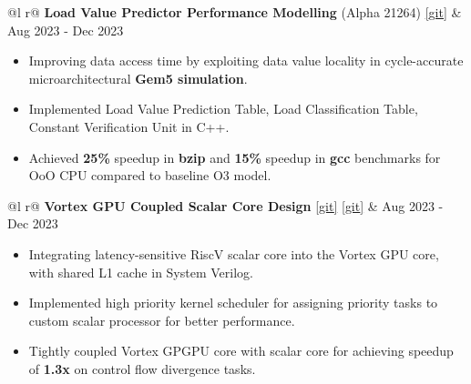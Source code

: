 \documentclass[a4paper,10pt]{article}
\begin{document}
\begin{tabularx}{\linewidth}{ @{}l r@{} }
    \textbf{Load Value Predictor Performance Modelling} (Alpha 21264) \href{https://github.com/sharathat45/load_value_predictor/tree/lvp_v1}{[\underline{git}]} 
    & \hfill {\small Aug 2023 - Dec 2023} \\[2.75pt]
    {
        \begin{minipage}[t]{\linewidth}
            \begin{itemize}[nosep, after=\strut, leftmargin=2em, itemsep=3pt]
                \item Improving data access time by exploiting data value locality in cycle-accurate microarchitectural \textbf{Gem5 simulation}. 
                \item Implemented Load Value Prediction Table, Load Classification Table, Constant Verification Unit in C++. 
                \item Achieved \textbf{25\%} speedup in \textbf{bzip} and \textbf{15\%} speedup in \textbf{gcc} benchmarks for OoO CPU compared to baseline O3 model.
            \end{itemize}
        \end{minipage}
    } 
\end{tabularx}
\vspace{0.1cm}

\begin{tabularx}{\linewidth}{ @{}l r@{} }
    \textbf{Vortex GPU Coupled Scalar Core Design} \href{https://gitfront.io/r/Sharath/tkpYU7EunMqf/GPU-scalar-riscV-design/}{[\underline{git}]} \href{https://github.com/TehkCode/Vortex-Purdue/tree/ArchV1_3}{[\underline{git}]} & \hfill {\small Aug 2023 - Dec 2023} \\[2.75pt]
    {
        \begin{minipage}[t]{\linewidth}
            \begin{itemize}[nosep,after=\strut, leftmargin=2em, itemsep=3pt]
                \item Integrating latency-sensitive RiscV scalar core into the Vortex GPU core, with shared L1 cache in System Verilog.
                \item Implemented high priority kernel scheduler for assigning priority tasks to custom scalar processor for better performance.
                \item Tightly coupled Vortex GPGPU core with scalar core for achieving speedup of \textbf{1.3x} on control flow divergence tasks. 
            \end{itemize}
        \end{minipage}
    } 
\end{tabularx}
\vspace{0.1cm}
\end{document}
